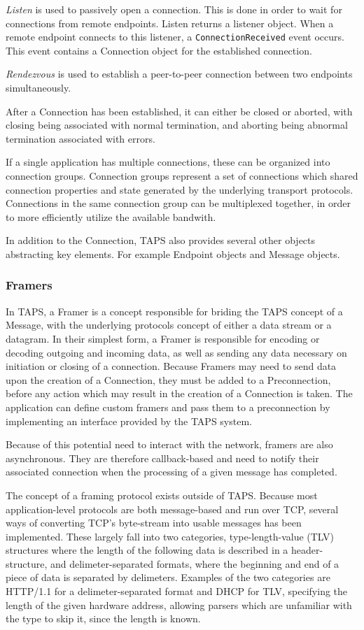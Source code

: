 \textit{Listen} is used to passively open a connection. This is done in order to
wait for connections from remote endpoints. Listen returns a listener
object. When a remote endpoint connects to this listener, a \texttt{ConnectionReceived}
event occurs. This event contains a Connection object for the 
established connection.

\textit{Rendezvous} is used to establish a peer-to-peer connection between two endpoints
simultaneously.

After a Connection has been established, it can either
be closed or aborted, with closing being associated with normal termination,
and aborting being abnormal termination associated with errors.

If a single application has multiple connections, these can be organized
into connection groups. Connection groups represent a set of connections
which shared connection properties and state generated by the underlying
transport protocols. Connections in the same connection group can be
multiplexed together, in order to more efficiently utilize the available
bandwith.

In addition to the Connection, TAPS also provides several other objects
abstracting key elements. For example Endpoint objects and Message objects.

\subsubsection{Framers}
In TAPS, a Framer is a concept responsible for briding the TAPS concept
of a Message, with the underlying protocols concept of either a data stream
or a datagram. In their simplest form, a Framer is responsible for encoding
or decoding outgoing and incoming data, as well as sending any data necessary
on initiation or closing of a connection. Because Framers may need to send
data upon the creation of a Connection, they must be added to a Preconnection,
before any action which may result in the creation of a Connection is taken.
The application can define custom framers and pass them to a preconnection
by implementing an interface provided by the TAPS system.

Because of this potential need to interact with the network, 
framers are also asynchronous. They are therefore callback-based and need
to notify their associated connection when the processing of a given message
has completed.

The concept of a framing protocol exists outside of TAPS. Because most
application-level protocols are both message-based and run over TCP, several
ways of converting TCP's byte-stream into usable messages has been implemented.
These largely fall into two categories, type-length-value (TLV) structures where
the length of the following data is described in a header-structure, and
delimeter-separated formats, where the beginning and end of a piece of
data is separated by delimeters. \cite{brunstromImplementingInterfacesTransport2025}
Examples of the two categories are HTTP/1.1 for a delimeter-separated format
and DHCP for TLV, specifying the length of the given hardware address, allowing
parsers which are unfamiliar with the type to skip it, since the length is known. \cite{dromsDynamicHostConfiguration1997}

